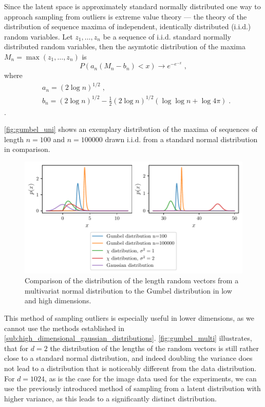 Since the latent space is approximately standard normally distributed one way
to approach sampling from outliers is extreme value theory --- the theory of
the distribution of sequence maxima of independent, identically distributed
(i.i.d.) random variables. Let $z_1, \dots, z_n$ be a sequence of i.i.d.
standard normally distributed random variables, then the asymtotic distribution
of the maxima $M_n = \max (z_1, \dots, z_n)$ is
\begin{equation}%
	\label{eq:gumbel_distribution}
	P(a_n ( M_n - b_n ) < x) \rightarrow e^{-e^{-x}}\;,
\end{equation}
where
\begin{equation}
	\begin{aligned}%
		\label{eq:gumbel_params}
		 & a_n = (2 \log n )^{1/2}\;,                                         \\
		 & b_n = (2 \log n )^{1/2} - \frac{1}{2} (2 \log n )^{1/2} (\log \log
		n + \log 4 \pi)\;.
	\end{aligned}
\end{equation}
\citep{leadbetterAsymptoticDistributionsExtremes1983}.

\autoref{fig:gumbel_uni} shows an exemplary distribution of the maxima of
sequences of length $n = 100$ and $n = 100000$ drawn i.i.d. from a standard
normal distribution in comparison.
\begin{figure}[htpb]
	\centering
        \includegraphics{figures/samples/gumbel_multi.pdf}
	\caption{Comparison of the distribution of the length random vectors
		from a multivariat normal distribution to the Gumbel distribution in
		low and high dimensions.}%
	\label{fig:gumbel_multi}
\end{figure}

This method of sampling outliers is especially useful in lower dimensions, as
we cannot use the methods established in
\autoref{sub:high_dimensional_gaussian_distributions}. 
\autoref{fig:gumbel_multi} illustrates, that for $d=2$ the distribution of the lengths of
the random vectors is still rather close to a standard normal distribution, and
indeed doubling the variance does not lead to a distribution that is noticeably
different from the data distribution. For $d=1024$, as is the case for the
image data used for the experiments, we can use the previously introduced
method of sampling from a latent distribution with higher variance, as this
leads to a significantly distinct distribution.

